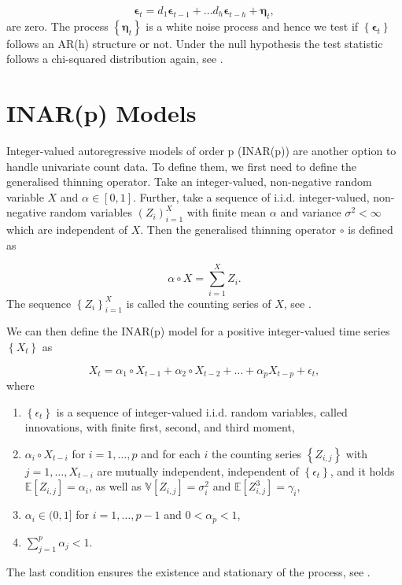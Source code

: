 \begin{equation}
\bm{\epsilon}_t = d_1\bm{\epsilon}_{t-1} +\ldots d_h \bm{\epsilon}_{t-h} + \bm{\eta}_t,
\label{eq:Breusch-Godfrey Test model}
\end{equation}
%
are zero. The process $\left\{\bm{\eta}_t\right\}$ is a white noise process and hence we test if $\left\{\bm{\epsilon}_t\right\}$ follows an AR(h) structure or not. Under the null hypothesis the test statistic follows a chi-squared distribution again, see \textcite{Lütkepohl:2007}. 

\section{INAR(p) Models}
\label{sec: Inar Models}

Integer-valued autoregressive models of order p (INAR(p)) are another option to handle univariate count data. To define them, we first need to define the generalised thinning operator. Take an integer-valued, non-negative random variable $X$ and $\alpha \in [0,1]$. Further, take a sequence of i.i.d. integer-valued, non-negative random variables $(Z_i)_{i=1}^X$ with finite mean $\alpha$ and variance $\sigma^2<\infty $ which are independent of $X$. Then the generalised thinning operator $\circ$ is defined as

\begin{equation}
\alpha \circ X = \sum_{i=1}^X Z_i .
\label{eq:Thinning operator}
\end{equation}
%
The sequence  $\left\{Z_i \right\}_{i=1}^X$ is called the counting series of $X$, see \textcite{Silva:2005}. 

We can then define the INAR(p) model for a positive integer-valued time series $\left\{X_t \right\}$ as

\begin{equation}
X_t = \alpha_1 \circ X_{t-1} + \alpha_2 \circ X_{t-2} + \ldots + \alpha_p X_{t-p} +\epsilon_t ,
\label{eq:Inar(p) model}
\end{equation}
%
where

\begin{enumerate}
	\item $\left\{\epsilon_t\right\}$ is a sequence of integer-valued i.i.d. random variables, called innovations, with finite first, second, and third moment, 
	\item $\alpha_i \circ X_{t-i}$ for $i= 1,\ldots,p$ and for each $i$ the counting series $\left\{Z_{i,j}\right\}$ with $j=1,\ldots,X_{t-i}$ are mutually independent, independent of $\left\{\epsilon_t\right\}$, and it holds $\mathbb{E}[Z_{i,j}]=\alpha_i$, as well as $\mathbb{V}[Z_{i,j}] = \sigma_i^2$ and $\mathbb{E}[Z_{i,j}^3] = \gamma_i$,
	\item $\alpha_i \in (0,1]$ for $i=1,\ldots,p-1$ and $0 < \alpha_p < 1$,
	\item $\sum_{j=1}^p \alpha_j < 1$.
\end{enumerate}
%
The last condition ensures the existence and stationary of the process, see \textcite{Silva:2005}. 

